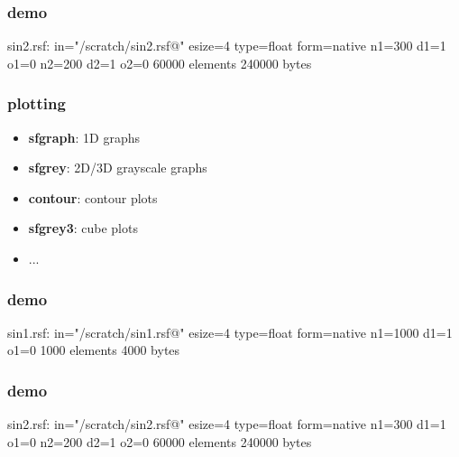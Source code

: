 \begin{frame}[fragile] \frametitle{demo}

  
  \vfill
  
  \tiny
\begin{semiverbatim}
sin2.rsf:
    in="/scratch/sin2.rsf@"
    esize=4 type=float form=native
    n1=300         d1=1           o1=0
    n2=200         d2=1           o2=0
        60000 elements 240000 bytes
\end{semiverbatim}
\normalsize

\end{frame}
\cwpnote{}

\begin{frame} \frametitle{plotting}

\begin{itemize}
   \item {\bf sfgraph}: 1D graphs
   \item {\bf sfgrey}: 2D/3D grayscale graphs
   \item {\bf contour}: contour plots
   \item {\bf sfgrey3}: cube plots
   \item ...
\end{itemize}

\end{frame}
\cwpnote{}

\begin{frame}[fragile] \frametitle{demo}

  \tiny
\begin{semiverbatim}
sin1.rsf:
    in="/scratch/sin1.rsf@"
    esize=4 type=float form=native
    n1=1000        d1=1           o1=0
        1000 elements 4000 bytes
\end{semiverbatim}
\normalsize

  \vfill
  

\end{frame}
\cwpnote{}

\begin{frame}[fragile] \frametitle{demo}

  \tiny
\begin{semiverbatim}
sin2.rsf:
    in="/scratch/sin2.rsf@"
    esize=4 type=float form=native
    n1=300         d1=1           o1=0
    n2=200         d2=1           o2=0
        60000 elements 240000 bytes
\end{semiverbatim}
\normalsize

  \vfill

\end{frame}
\cwpnote{}

